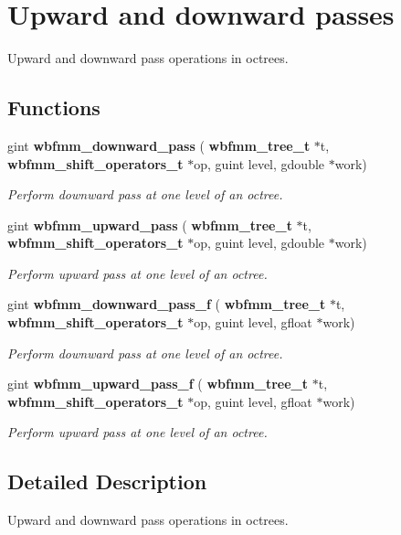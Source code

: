 \section{Upward and downward passes}
\label{group__pass}


Upward and downward pass operations in octrees.  


\subsection*{Functions}
\begin{DoxyCompactItemize}
\item 
gint \textbf{ wbfmm\+\_\+downward\+\_\+pass} (\textbf{ wbfmm\+\_\+tree\+\_\+t} $\ast$t, \textbf{ wbfmm\+\_\+shift\+\_\+operators\+\_\+t} $\ast$op, guint level, gdouble $\ast$work)
\begin{DoxyCompactList}\small\item\em Perform downward pass at one level of an octree. \end{DoxyCompactList}\item 
gint \textbf{ wbfmm\+\_\+upward\+\_\+pass} (\textbf{ wbfmm\+\_\+tree\+\_\+t} $\ast$t, \textbf{ wbfmm\+\_\+shift\+\_\+operators\+\_\+t} $\ast$op, guint level, gdouble $\ast$work)
\begin{DoxyCompactList}\small\item\em Perform upward pass at one level of an octree. \end{DoxyCompactList}\item 
gint \textbf{ wbfmm\+\_\+downward\+\_\+pass\+\_\+f} (\textbf{ wbfmm\+\_\+tree\+\_\+t} $\ast$t, \textbf{ wbfmm\+\_\+shift\+\_\+operators\+\_\+t} $\ast$op, guint level, gfloat $\ast$work)
\begin{DoxyCompactList}\small\item\em Perform downward pass at one level of an octree. \end{DoxyCompactList}\item 
gint \textbf{ wbfmm\+\_\+upward\+\_\+pass\+\_\+f} (\textbf{ wbfmm\+\_\+tree\+\_\+t} $\ast$t, \textbf{ wbfmm\+\_\+shift\+\_\+operators\+\_\+t} $\ast$op, guint level, gfloat $\ast$work)
\begin{DoxyCompactList}\small\item\em Perform upward pass at one level of an octree. \end{DoxyCompactList}\end{DoxyCompactItemize}


\subsection{Detailed Description}
Upward and downward pass operations in octrees. 



